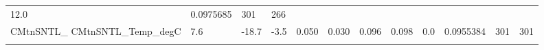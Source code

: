 \documentclass[11pt]{article}
\begin{document}
\begin{longtable}[]{@{}llllllllllll@{}}
\begin{minipage}[t]{0.05\columnwidth}
12.0\strut
\end{minipage} & \begin{minipage}[t]{0.05\columnwidth}\raggedright\strut
0.0975685\strut
\end{minipage} & \begin{minipage}[t]{0.05\columnwidth}\raggedright\strut
301\strut
\end{minipage} & \begin{minipage}[t]{0.07\columnwidth}\raggedright\strut
266\strut
\end{minipage}\tabularnewline
\begin{minipage}[t]{0.18\columnwidth}\raggedright\strut
CMtnSNTL\_ CMtnSNTL\_Temp\_degC\strut
\end{minipage} & \begin{minipage}[t]{0.04\columnwidth}\raggedright\strut
7.6\strut
\end{minipage} & \begin{minipage}[t]{0.04\columnwidth}\raggedright\strut
-18.7\strut
\end{minipage} & \begin{minipage}[t]{0.04\columnwidth}\raggedright\strut
-3.5\strut
\end{minipage} & \begin{minipage}[t]{0.04\columnwidth}\raggedright\strut
0.050\strut
\end{minipage} & \begin{minipage}[t]{0.05\columnwidth}\raggedright\strut
0.030\strut
\end{minipage} & \begin{minipage}[t]{0.04\columnwidth}\raggedright\strut
0.096\strut
\end{minipage} & \begin{minipage}[t]{0.04\columnwidth}\raggedright\strut
0.098\strut
\end{minipage} & \begin{minipage}[t]{0.05\columnwidth}\raggedright\strut
0.0\strut
\end{minipage} & \begin{minipage}[t]{0.05\columnwidth}\raggedright\strut
0.0955384\strut
\end{minipage} & \begin{minipage}[t]{0.05\columnwidth}\raggedright\strut
301\strut
\end{minipage} & \begin{minipage}[t]{0.07\columnwidth}\raggedright\strut
301\strut
\end{minipage}\tabularnewline
\begin{minipage}[t]{0.18\columnwidth}\raggedright\strut

\end{minipage}
\end{longtable}
\end{document}

